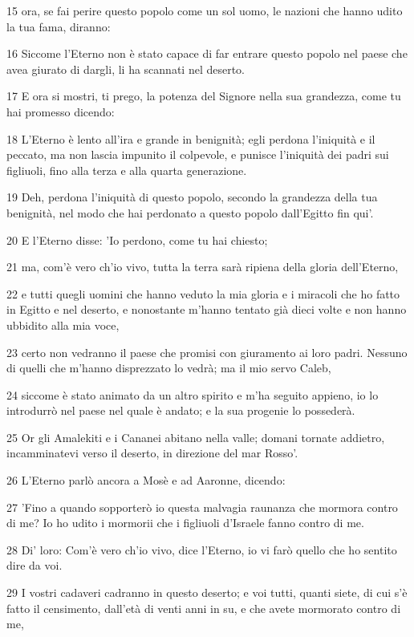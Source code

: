 \par 15 ora, se fai perire questo popolo come un sol uomo, le nazioni che hanno udito la tua fama, diranno:
\par 16 Siccome l'Eterno non è stato capace di far entrare questo popolo nel paese che avea giurato di dargli, li ha scannati nel deserto.
\par 17 E ora si mostri, ti prego, la potenza del Signore nella sua grandezza, come tu hai promesso dicendo:
\par 18 L'Eterno è lento all'ira e grande in benignità; egli perdona l'iniquità e il peccato, ma non lascia impunito il colpevole, e punisce l'iniquità dei padri sui figliuoli, fino alla terza e alla quarta generazione.
\par 19 Deh, perdona l'iniquità di questo popolo, secondo la grandezza della tua benignità, nel modo che hai perdonato a questo popolo dall'Egitto fin qui'.
\par 20 E l'Eterno disse: 'Io perdono, come tu hai chiesto;
\par 21 ma, com'è vero ch'io vivo, tutta la terra sarà ripiena della gloria dell'Eterno,
\par 22 e tutti quegli uomini che hanno veduto la mia gloria e i miracoli che ho fatto in Egitto e nel deserto, e nonostante m'hanno tentato già dieci volte e non hanno ubbidito alla mia voce,
\par 23 certo non vedranno il paese che promisi con giuramento ai loro padri. Nessuno di quelli che m'hanno disprezzato lo vedrà; ma il mio servo Caleb,
\par 24 siccome è stato animato da un altro spirito e m'ha seguito appieno, io lo introdurrò nel paese nel quale è andato; e la sua progenie lo possederà.
\par 25 Or gli Amalekiti e i Cananei abitano nella valle; domani tornate addietro, incamminatevi verso il deserto, in direzione del mar Rosso'.
\par 26 L'Eterno parlò ancora a Mosè e ad Aaronne, dicendo:
\par 27 'Fino a quando sopporterò io questa malvagia raunanza che mormora contro di me? Io ho udito i mormorii che i figliuoli d'Israele fanno contro di me.
\par 28 Di' loro: Com'è vero ch'io vivo, dice l'Eterno, io vi farò quello che ho sentito dire da voi.
\par 29 I vostri cadaveri cadranno in questo deserto; e voi tutti, quanti siete, di cui s'è fatto il censimento, dall'età di venti anni in su, e che avete mormorato contro di me,
